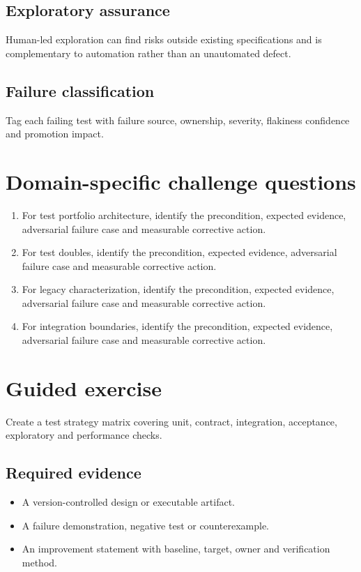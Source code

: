 \documentclass[10pt,letterpaper]{article}
\begin{document}
\subsection{Exploratory assurance}
Human-led exploration can find risks outside existing specifications and is complementary to automation rather than an unautomated defect.

\subsection{Failure classification}
Tag each failing test with failure source, ownership, severity, flakiness confidence and promotion impact.

\section{Domain-specific challenge questions}
\begin{enumerate}
\item For test portfolio architecture, identify the precondition, expected evidence, adversarial failure case and measurable corrective action.
\item For test doubles, identify the precondition, expected evidence, adversarial failure case and measurable corrective action.
\item For legacy characterization, identify the precondition, expected evidence, adversarial failure case and measurable corrective action.
\item For integration boundaries, identify the precondition, expected evidence, adversarial failure case and measurable corrective action.
\end{enumerate}
\section{Guided exercise}
Create a test strategy matrix covering unit, contract, integration, acceptance, exploratory and performance checks.

\subsection{Required evidence}
\begin{itemize}
\item A version-controlled design or executable artifact.
\item A failure demonstration, negative test or counterexample.
\item An improvement statement with baseline, target, owner and verification method.
\end{itemize}
\end{document}
